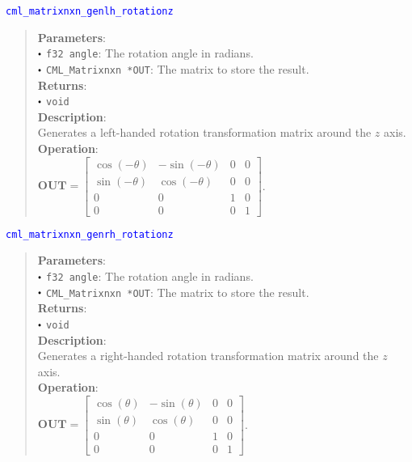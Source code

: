 \documentclass[a4paper,oneside,8pt]{extarticle}
\newcommand{\function}[1]{
  \noindent\textcolor{blue}{\texttt{#1}}
  \vspace{-0.3em}
}
\renewcommand{\dot}{\raisebox{0.3ex}{\scalebox{0.6}{$\bullet$}}}
\theoremstyle{definition}
\begin{document}
\function{cml\_matrixnxn\_genlh\_rotationz}
\begin{quote}
  \textbf{Parameters}: \\
  $\dot$ \texttt{f32 angle}: The rotation angle in radians. \\
  $\dot$ \texttt{CML\_Matrixnxn *OUT}: The matrix to store the result. \\
  \textbf{Returns}: \\
  $\dot$ \texttt{void} \\

  \vspace{-0.75em}
  \textbf{Description}: \\
  Generates a left-handed rotation transformation matrix around the $z$ axis. \\

  \vspace{-0.75em}
  \textbf{Operation}: \\
  $\mathbf{OUT} = \begin{bmatrix}
  \cos(-\theta) & -\sin(-\theta) & 0 & 0 \\
  \sin(-\theta) & \cos(-\theta) & 0 & 0 \\
  0 & 0 & 1 & 0 \\
  0 & 0 & 0 & 1
  \end{bmatrix}$. \\
\end{quote}

\function{cml\_matrixnxn\_genrh\_rotationz}
\begin{quote}
  \textbf{Parameters}: \\
  $\dot$ \texttt{f32 angle}: The rotation angle in radians. \\
  $\dot$ \texttt{CML\_Matrixnxn *OUT}: The matrix to store the result. \\
  \textbf{Returns}: \\
  $\dot$ \texttt{void} \\

  \vspace{-0.75em}
  \textbf{Description}: \\
  Generates a right-handed rotation transformation matrix around the $z$ axis. \\

  \vspace{-0.75em}
  \textbf{Operation}: \\
  $\mathbf{OUT} = \begin{bmatrix}
  \cos(\theta) & -\sin(\theta) & 0 & 0 \\
  \sin(\theta) & \cos(\theta) & 0 & 0 \\
  0 & 0 & 1 & 0 \\
  0 & 0 & 0 & 1
  \end{bmatrix}$. \\
\end{quote}
\end{document}
